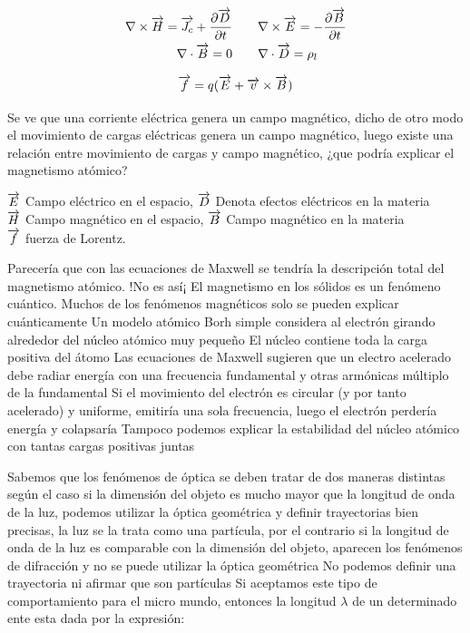 \begin{equation*}
\label{eq:100}
\begin{aligned}
	\nabla \times \overrightarrow{H} = \overrightarrow{J_{c}} + \dfrac{\partial \overrightarrow{D}}{\partial t} 
	\quad \quad
	&\nabla \times \overrightarrow{E} = - \dfrac{\partial \overrightarrow{B}}{\partial t} 	\\
	\nabla \cdot \overrightarrow{B}=0
	\quad \quad
	&\nabla \cdot \overrightarrow{D} = \rho_{l}
\end{aligned}
\end{equation*}

\begin{equation*}
	\overrightarrow{f}= q(\overrightarrow{E}+\overrightarrow{v}\times\overrightarrow{B})
\end{equation*}

Se ve que una corriente eléctrica genera un campo magnético, dicho de otro modo el movimiento de cargas eléctricas genera un campo magnético, luego existe una relación entre movimiento de cargas y campo magnético, ¿que podría explicar el magnetismo atómico?

$\overrightarrow{E}$ Campo eléctrico en el espacio, $\overrightarrow{D}$ Denota efectos eléctricos en la materia \\
$\overrightarrow{H}$ Campo magnético en el espacio, $\overrightarrow{B}$ Campo magnético en la materia \\
$\overrightarrow{f}$ fuerza de Lorentz.

Parecería que con las ecuaciones de Maxwell se tendría la descripción total del magnetismo atómico. !No es así¡ El magnetismo en los sólidos es un fenómeno cuántico. Muchos de los fenómenos magnéticos solo se pueden explicar cuánticamente Un modelo atómico Borh simple considera al electrón girando alrededor del núcleo atómico muy pequeño El núcleo contiene toda la carga positiva del átomo Las ecuaciones de Maxwell sugieren que un electro acelerado debe radiar energía con una frecuencia fundamental y otras armónicas múltiplo de la fundamental Si el movimiento del electrón es circular (y por tanto acelerado) y uniforme, emitiría una sola frecuencia, luego el electrón perdería energía y colapsaría Tampoco podemos explicar la estabilidad del núcleo atómico con tantas cargas positivas juntas

Sabemos que los fenómenos de óptica se deben tratar de dos maneras distintas según el caso si la dimensión del objeto es mucho mayor que la longitud de onda de la luz, podemos utilizar la óptica geométrica y definir trayectorias bien precisas, la luz se la trata como una partícula, por el contrario si la longitud de onda de la luz es comparable con la dimensión del objeto, aparecen los fenómenos de difracción y no se puede utilizar la óptica geométrica No podemos definir una trayectoria ni afirmar que son partículas Si aceptamos este tipo de comportamiento para el micro mundo, entonces la longitud $\lambda$ de un determinado ente esta dada por la expresión:

